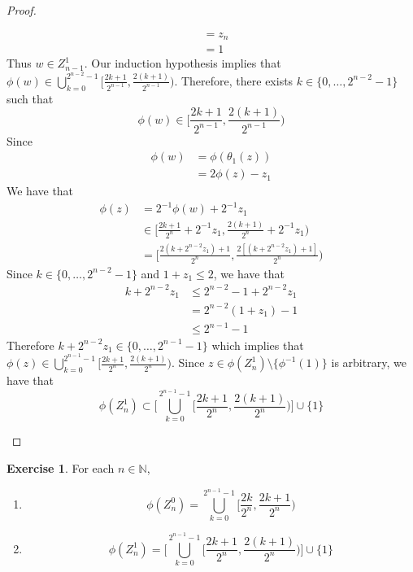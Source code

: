 \documentclass{book}
\theoremstyle{definition}
\newtheorem{ex}[definition]{Exercise}
\newcommand{\N}{\mathbb{N}}
\newcommand{\lex}[1]{\label{ex:#1}}
\DeclareMathOperator*{\0}{\mbf{0}}
\DeclareMathOperator*{\1}{\mbf{1}}
\begin{document}
\begin{proof}
\begin{enumerate}
\begin{align*}
				& = z_n \\
				& = 1
			\end{align*} 
			Thus $w \in Z_{n-1}^1$. Our induction hypothesis implies that $\phi(w) \in \bigcup\limits_{k =0}^{2^{n-2} -1} \bigg[ \frac{2k+1}{2^{n-1}}, \frac{2(k+1)}{2^{n-1}} \bigg)$. Therefore, there exists $k \in \{0, \ldots, 2^{n-2} -1\}$ such that $$\phi(w) \in \bigg[ \frac{2k+1}{2^{n-1}}, \frac{2(k+1)}{2^{n-1}} \bigg)$$ Since 
			\begin{align*}
				\phi(w) 
				& = \phi(\theta_1(z)) \\
				& = 2 \phi(z) - z_1
			\end{align*}
			We have that
			\begin{align*}
				\phi(z) 
				& = 2^{-1}\phi(w) + 2^{-1} z_1 \\
				& \in \bigg[ \frac{2k+1}{2^n} + 2^{-1}z_1, \frac{2(k + 1)}{2^n} +  2^{-1}z_1 \bigg) \\
				& = \bigg[ \frac{2(k+ 2^{n-2}z_1) + 1}{2^n}, \frac{2[(k+ 2^{n-2}z_1) + 1]}{2^n} \bigg) 
			\end{align*}
			Since $k \in \{0, \ldots, 2^{n-2} -1\}$ and $1 + z_1 \leq 2$, we have that 
			\begin{align*}
				k+ 2^{n-2}z_1 
				& \leq 2^{n-2} -1 + 2^{n-2}z_1  \\
				&  =  2^{n-2}(1 + z_1) - 1 \\
				& \leq 2^{n-1} - 1
			\end{align*} 
			Therefore $	k+ 2^{n-2}z_1 \in \{0, \ldots, 2^{n-1} - 1\}$ which implies that $\phi(z) \in  \bigcup\limits_{k =0}^{2^{n-1} -1} \bigg[ \frac{2k+1}{2^n}, \frac{2(k+1)}{2^n} \bigg)$. Since $z \in \phi(Z_n^1) \setminus \{\phi^{-1}(1)\}$ is arbitrary, we have that
			$$\phi(Z_n^1 ) \subset \bigg[ \bigcup\limits_{k =0}^{2^{n-1} -1} \bigg[ \frac{2k + 1}{2^n}, \frac{2(k+1)}{2^n} \bigg) \bigg] \cup \{1\}$$
		\end{enumerate}
	\end{proof}



	\begin{ex} \lex{28005.2}
		For each $n \in \N$, 
		\begin{enumerate}
			\item $$\phi(Z_n^0) = \bigcup_{k =0}^{2^{n-1} -1} \bigg[ \frac{2k}{2^n}, \frac{2k+1}{2^n} \bigg)$$
			\item $$\phi(Z_n^1) = \bigg[ \bigcup\limits_{k =0}^{2^{n-1} -1} \bigg[ \frac{2k + 1}{2^n}, \frac{2(k+1)}{2^n} \bigg) \bigg] \cup \{1\}$$
		\end{enumerate}
	\end{ex}
\end{document}
